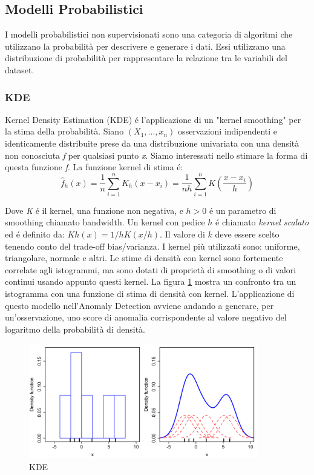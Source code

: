 \subsection{Modelli Probabilistici}
I modelli probabilistici non supervisionati sono una categoria di algoritmi che utilizzano la probabilità per descrivere e generare i dati. Essi utilizzano una distribuzione di probabilità per rappresentare la relazione tra le variabili del dataset.
\subsubsection{KDE}
Kernel Density Estimation (KDE) é l'applicazione di un "kernel smoothing" per la stima della probabilità. 
Siano $(X_1,...,x_n)$ osservazioni indipendenti e identicamente distribuite prese da una distribuzione univariata con una densità non conosciuta \textit{f} per qualsiasi punto \textit{x}. Siamo interessati nello stimare la forma di questa funzione \textit{f}. La funzione kernel di stima é:
\[\widehat{f}_h(x)=\frac{1}{n} \sum_{i=1}^n K_h\left(x-x_i\right)=\frac{1}{n h} \sum_{i=1}^n K\left(\frac{x-x_i}{h}\right)\]

Dove \textit{K} é il kernel, una funzione non negativa, e $h>0$ é un parametro di smoothing chiamato bandwidth. Un kernel con pedice $h$ é chiamato \textit{kernel scalato} ed é definito da: $Kh(x) = 1/h K(x/h)$. 
Il valore di $k$ deve essere scelto tenendo conto del trade-off bias/varianza.
I kernel più utilizzati sono: uniforme, triangolare, normale e altri.
Le stime di densità con kernel sono fortemente correlate agli istogrammi, ma sono dotati di proprietà di smoothing o di valori continui usando appunto questi kernel.
La figura \ref{kde_model} mostra un confronto tra un istogramma con una funzione di stima di densità con kernel.
L'applicazione di questo modello nell'Anomaly Detection avviene andando a generare, per un'osservazione, uno score di anomalia corrispondente al valore negativo del logaritmo della probabilità di densità.

\begin{figure}[t]
	\centering
	\includegraphics[width=10cm, scale=1]{images/kde_model}
	\caption{KDE}
	\label{kde_model}
\end{figure}


